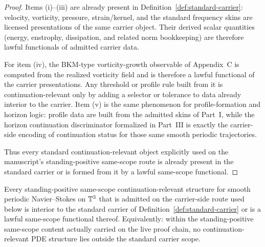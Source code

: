 \begin{proof}
Items (i)--(iii) are already present in Definition~\ref{def:standard-carrier}: velocity,
vorticity, pressure, strain/kernel, and the standard frequency skins are licensed presentations of the
same carrier object. Their derived scalar quantities (energy, enstrophy, dissipation, and related
norm bookkeeping) are therefore lawful functionals of admitted carrier data.

For item (iv), the BKM-type vorticity-growth observable of Appendix~C is computed from the realized
vorticity field and is therefore a lawful functional of the carrier presentations. Any threshold or
profile rule built from it is continuation-relevant only by adding a selector or tolerance to data
already interior to the carrier. Item (v) is the same phenomenon for profile-formation and horizon
logic: profile data are built from the admitted skins of Part~I, while the horizon continuation
discriminator formalized in Part~III is exactly the carrier-side encoding of continuation status for
those same smooth periodic trajectories.

Thus every standard continuation-relevant object explicitly used on the manuscript's standing-positive same-scope route is already present in the standard carrier or is formed from it by a lawful same-scope functional.
\end{proof}

\begin{theorem}
\label{thm:scope-completeness-standard-carrier}
Every standing-positive same-scope continuation-relevant structure for smooth periodic Navier--Stokes on $\mathbb{T}^3$ that is admitted on the carrier-side route used below is interior to the standard carrier of Definition~\ref{def:standard-carrier} or is a lawful same-scope functional thereof. Equivalently: within the standing-positive same-scope content actually carried on the live proof chain, no continuation-relevant PDE structure lies outside the standard carrier scope.
\end{theorem}

